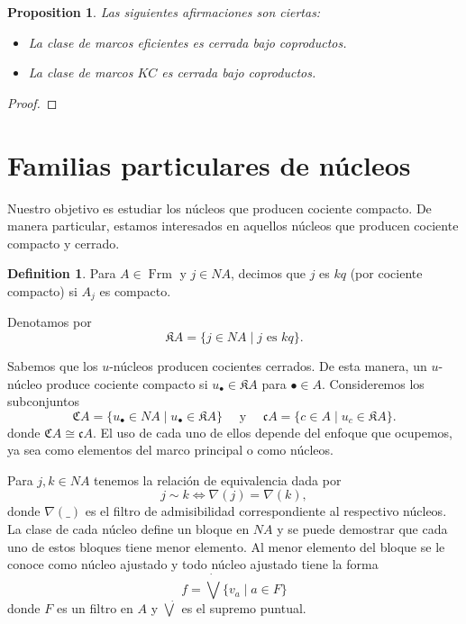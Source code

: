\documentclass[11pt]{amsart}
\DeclareMathOperator{\Frm}{Frm}
\theoremstyle{plain}
\newtheorem{prop}[thm]{Proposition}
\theoremstyle{definition}
\newtheorem{dfn}[thm]{Definition}
\begin{document}
\begin{prop}\label{coprod}
Las siguientes afirmaciones son ciertas:
\begin{itemize}
\item[(1)] La clase de marcos eficientes es cerrada bajo coproductos.
\item[(2)] La clase de marcos $KC$ es cerrada bajo coproductos. 
\end{itemize}	
\end{prop}

\begin{proof}

\end{proof}

\section{Familias particulares de núcleos}
Nuestro objetivo es estudiar los núcleos que producen cociente compacto. De manera particular, estamos interesados en 
aquellos núcleos que producen cociente compacto y cerrado.\\

\begin{dfn}\label{Definicion2.1}
Para $A\in \Frm$ y $j\in NA$, decimos que $j$ es $kq$ (por cociente compacto) si $A_j$ es compacto.  
\end{dfn}

Denotamos por 
\[
\mathfrak{K}A=\{j\in NA\mid j \mbox{ es } kq\}.
\]

Sabemos que los $u$-núcleos producen cocientes cerrados. De esta manera, un $u$-núcleo produce cociente compacto si $u_{\bullet}\in \mathfrak{K}A$ para $\bullet\in A$. Consideremos los subconjuntos
\[
\mathfrak{C}A=\{u_\bullet\in NA\mid u_\bullet\in \mathfrak{K}A\}\quad \mbox{ y }\quad \mathfrak{c}A=\{c\in A\mid u_c\in \mathfrak{K}A\}.
\]
donde $\mathfrak{C}A\cong \mathfrak{c}A$. El uso de cada uno de ellos depende del enfoque que ocupemos, ya sea como elementos del marco principal o como núcleos.

Para $j, k\in NA$ tenemos la relación de equivalencia dada por 
\[
j\sim k \Leftrightarrow \nabla(j)=\nabla(k),
\]
donde $\nabla( \_ )$ es el filtro de admisibilidad correspondiente al respectivo núcleos.\\

La clase de cada núcleo define un bloque en $NA$ y se puede demostrar que cada uno de estos bloques tiene menor elemento. Al menor elemento del bloque se le conoce como núcleo ajustado y todo núcleo ajustado tiene la forma
\[
f=\dot\bigvee \{v_a\mid a\in F\}
\]
donde $F$ es un filtro en $A$ y $\dot{\bigvee}$ es el supremo puntual.
\end{document}
